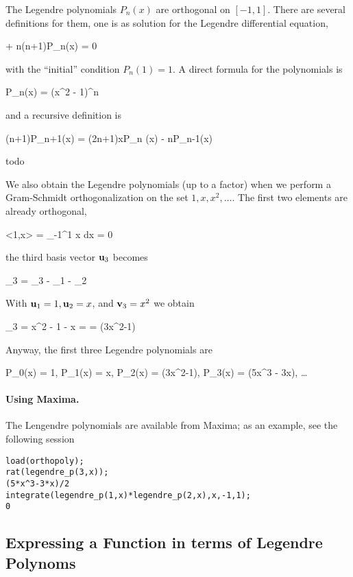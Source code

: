The Legendre polynomials $P_n(x)$ are orthogonal on $[-1,1]$. There are several definitions for them, one is as solution for the Legendre differential equation,

\bee
{}  + n(n+1)P_n(x) = 0
\eee

with the ``initial'' condition $P_n(1) = 1$. A direct formula for the polynomials is

\bee
P_n(x) = (x^2 - 1)^n
\eee

and a recursive definition is

\bee
(n+1)P_{n+1}(x) = (2n+1)xP_n (x) - nP_{n-1}(x)
\eee

todo

We also obtain the Legendre polynomials (up to a factor) when we perform a Gram-Schmidt orthogonalization on the set $1,x,x^2, \ldots$. The first two elements are already orthogonal,

\bee
<1,x> = \int_{-1}^1 x dx = 0
\eee

the third basis vector $\mathbf{u}_3$ becomes

\bee
\ubf_3 = \vbf_3 -  \ubf_1 -  \ubf_2
\eee

With $\mathbf{u}_1 = 1, \mathbf{u}_2 = x$, and $\mathbf{v}_3 = x^2$ we obtain

\bee
\ubf_3 = x^2 - 1 - x = \cdots = (3x^2-1)
\eee

Anyway, the first three Legendre polynomials are

\bee
P_0(x) = 1, P_1(x) = x, P_2(x) = (3x^2-1), P_3(x) = (5x^3 - 3x), \ldots
\eee

\paragraph{Using Maxima.} The Lengendre polynomials are available from Maxima; as an example, see the following session

\begin{verbatim}
load(orthopoly);
rat(legendre_p(3,x));
(5*x^3-3*x)/2
integrate(legendre_p(1,x)*legendre_p(2,x),x,-1,1);
0
\end{verbatim}

\subsection{Expressing a Function in terms of Legendre Polynoms}

